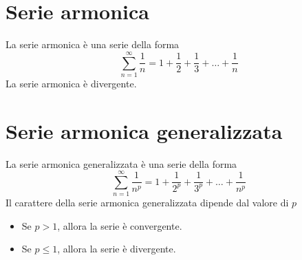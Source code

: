 \documentclass{article}
\begin{document}
\section*{Serie armonica}
La serie armonica è una serie della forma
\begin{equation*}
    \sum_{n=1}^\infty \frac{1}{n} = 1 + \frac{1}{2} + \frac{1}{3} + \dots + \frac{1}{n}
\end{equation*}
La serie armonica è divergente.
\section*{Serie armonica generalizzata}
La serie armonica generalizzata è una serie della forma
\begin{equation*}
    \sum_{n=1}^\infty \frac{1}{n^p} = 1 + \frac{1}{2^p} + \frac{1}{3^p} + \dots + \frac{1}{n^p}
\end{equation*}
Il carattere della serie armonica generalizzata dipende dal valore di $p$
\begin{itemize}
    \item Se $p>1$, allora la serie è convergente.
    \item Se $p \leq 1$, allora la serie è divergente.
\end{itemize}
\newpage
\end{document}
